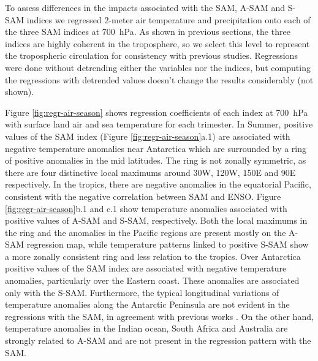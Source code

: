 \documentclass[smallextended]{svjour3}       %
\begin{document}
To assess differences in the impacts associated with the SAM, A\nobreakdash-SAM and S\nobreakdash-SAM indices we regressed 2-meter air temperature and precipitation onto each of the three SAM indices at 700~hPa.
As shown in previous sections, the three indices are highly coherent in the troposphere, so we select this level to represent the tropospheric circulation for consistency with previous studies.
Regressions were done without detrending either the variables nor the indices, but computing the regressions with detrended values doesn't change the results considerably (not shown).

Figure \ref{fig:regr-air-season} shows regression coefficients of each index at 700~hPa with surface land air and sea temperature for each trimester.
In Summer, positive values of the SAM index (Figure \ref{fig:regr-air-season}a.1) are associated with negative temperature anomalies near Antarctica which are surrounded by a ring of positive anomalies in the mid latitudes.
The ring is not zonally symmetric, as there are four distinctive local maximums around 30\degree W, 120\degree W, 150\degree E and 90\degree E respectively.
In the tropics, there are negative anomalies in the equatorial Pacific, consistent with the negative correlation between SAM and ENSO.
Figure \ref{fig:regr-air-season}b.1 and c.1 show temperature anomalies associated with positive values of A\nobreakdash-SAM and S\nobreakdash-SAM, respectively.
Both the local maximums in the ring and the anomalies in the Pacific regions are present mostly on the A\nobreakdash-SAM regression map, while temperature patterns linked to positive S\nobreakdash-SAM show a more zonally consistent ring and less relation to the tropics.
Over Antarctica positive values of the SAM index are associated with negative temperature anomalies, particularly over the Eastern coast.
These anomalies are associated only with the S\nobreakdash-SAM.
Furthermore, the typical longitudinal variations of temperature anomalies along the Antarctic Peninsula are not evident in the regressions with the SAM, in agreement with previous works \citep[e.g.][]{marshall2016}.
On the other hand, temperature anomalies in the Indian ocean, South Africa and Australia are strongly related to A\nobreakdash-SAM and are not present in the regression pattern with the SAM.
\end{document}
